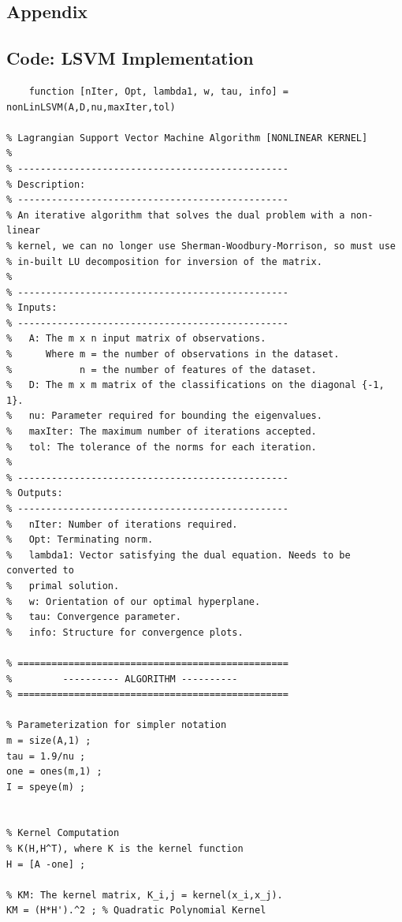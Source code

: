\documentclass{article}
\begin{document}
\newpage
\begin{appendices}

\section*{Appendix}
\subsection*{Code: LSVM Implementation}
\small
\begin{verbatim}
    function [nIter, Opt, lambda1, w, tau, info] = nonLinLSVM(A,D,nu,maxIter,tol)

% Lagrangian Support Vector Machine Algorithm [NONLINEAR KERNEL]
%
% ------------------------------------------------
% Description:
% ------------------------------------------------
% An iterative algorithm that solves the dual problem with a non-linear 
% kernel, we can no longer use Sherman-Woodbury-Morrison, so must use
% in-built LU decomposition for inversion of the matrix. 
%
% ------------------------------------------------
% Inputs:
% ------------------------------------------------
%   A: The m x n input matrix of observations.
%      Where m = the number of observations in the dataset.
%            n = the number of features of the dataset.
%   D: The m x m matrix of the classifications on the diagonal {-1, 1}.
%   nu: Parameter required for bounding the eigenvalues.
%   maxIter: The maximum number of iterations accepted.
%   tol: The tolerance of the norms for each iteration.
%
% ------------------------------------------------
% Outputs:
% ------------------------------------------------
%   nIter: Number of iterations required.
%   Opt: Terminating norm.
%   lambda1: Vector satisfying the dual equation. Needs to be converted to
%   primal solution.
%   w: Orientation of our optimal hyperplane.
%   tau: Convergence parameter.
%   info: Structure for convergence plots.

% ================================================
%         ---------- ALGORITHM ----------
% ================================================

% Parameterization for simpler notation
m = size(A,1) ;
tau = 1.9/nu ;
one = ones(m,1) ;
I = speye(m) ;


% Kernel Computation
% K(H,H^T), where K is the kernel function
H = [A -one] ;

% KM: The kernel matrix, K_i,j = kernel(x_i,x_j). 
KM = (H*H').^2 ; % Quadratic Polynomial Kernel


\end{verbatim}
\end{appendices}
\end{document}
